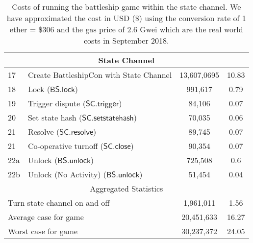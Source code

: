 \documentclass{llncs}
\newcommand{\statechanneldispute}{\mathsf{SC}.\mathsf{trigger}}
\newcommand{\statechannelsetstate}{\mathsf{SC}.\mathsf{setstatehash}}
\newcommand{\statechannelresolve}{\mathsf{SC}.\mathsf{resolve}}
\newcommand{\statechannelclose}{\mathsf{SC}.\mathsf{close}}
\newcommand{\battleshiplock}{\mathsf{BS.lock}}
\newcommand{\battleshipunlock}{\mathsf{BS.unlock}}
\begin{document}
\begin{table}
\begin{tabular}[]{l l c c}
			\hline
			\multicolumn{4}{c}{State Channel} \\
			\hline
			17 & Create BattleshipCon with State Channel & 13,607,0695 & 10.83 \\
			18 & Lock ($\battleshiplock$) & 991,617 & 0.79 \\
			19 & Trigger dispute ($\statechanneldispute$) & 84,106 & 0.07\\
			20 & Set state hash ($\statechannelsetstate$) & 70,035 & 0.06 \\
			21 & Resolve ($\statechannelresolve$) &89,745 & 0.07 \\
			21 & Co-operative turnoff ($\statechannelclose$) & 90,354 & 0.07 \\
			22a & Unlock ($\battleshipunlock$) & 725,508 & 0.6 \\
			22b & Unlock (No Activity) ($\battleshipunlock$) & 51,454 & 0.04 \\
			\hline
			\multicolumn{4}{c}{Aggregated Statistics} \\
			\hline
			\multicolumn{2}{l}{Turn state channel on and off} & 1,961,011  & 1.56 \\
			\multicolumn{2}{l}{Average case for game} & 20,451,633 & 16.27 \\
			\multicolumn{2}{l}{Worst case for game} & 30,237,372 & 24.05 \\
			\hline 
		\end{tabular}
		
		\caption{Costs of running the battleship game within the state channel. We have approximated the cost in USD (\$) using the conversion rate of 1 ether = \$306 and the gas price of 2.6 Gwei which are the real world costs in September 2018. }\label{tab:costs}
	\end{table}
	
\end{document}
